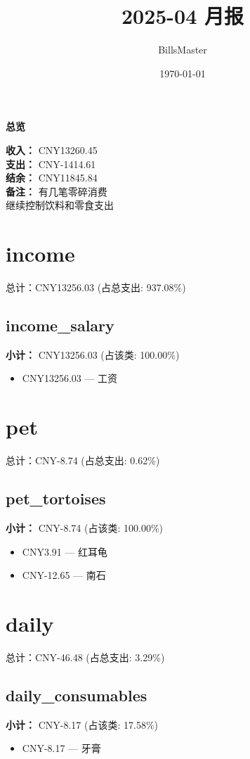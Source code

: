 \documentclass[12pt]{article}
\title{2025-04 月报}
\author{BillsMaster}
\date{\today}
\begin{document}
\maketitle

\vspace{1em}
\hrulefill
\begin{center}
    {\Large\bfseries 总览}\par\vspace{1em}
    {\large
    \textbf{收入：} CNY13260.45\\
    \textbf{支出：} CNY-1414.61\\
    \textbf{结余：} CNY11845.84\\
    \textbf{备注：} 有几笔零碎消费\\
    继续控制饮料和零食支出
    }
\end{center}
\hrulefill

\section*{income}
总计：CNY13256.03 	 (占总支出: 937.08\%)

\subsection*{income\_salary}
\textbf{小计：} CNY13256.03 (占该类: 100.00\%)
\begin{itemize}
    \item CNY13256.03 --- 工资
\end{itemize}
\section*{pet}
总计：CNY-8.74 	 (占总支出: 0.62\%)

\subsection*{pet\_tortoises}
\textbf{小计：} CNY-8.74 (占该类: 100.00\%)
\begin{itemize}
    \item CNY3.91 --- 红耳龟
    \item CNY-12.65 --- 南石
\end{itemize}
\section*{daily}
总计：CNY-46.48 	 (占总支出: 3.29\%)

\subsection*{daily\_consumables}
\textbf{小计：} CNY-8.17 (占该类: 17.58\%)
\begin{itemize}
    \item CNY-8.17 --- 牙膏
\end{itemize}
\end{document}
